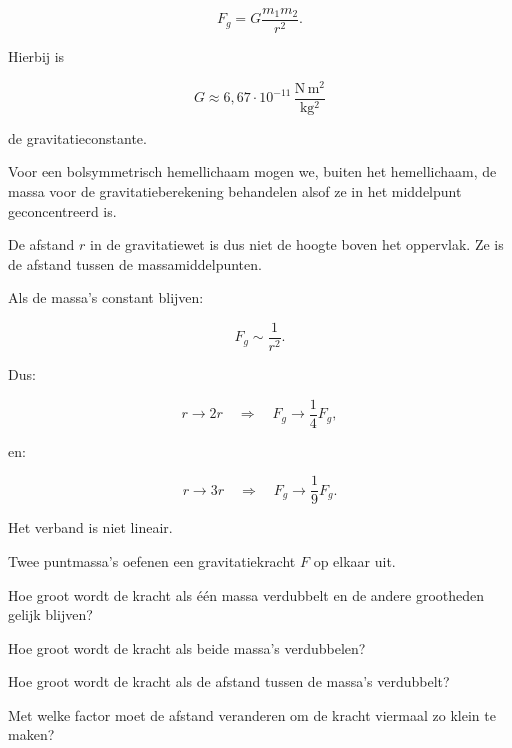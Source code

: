 \documentclass{ximera}
\begin{document}
\[
\boxed{
F_g=G\frac{m_1m_2}{r^2}.
}
\]

Hierbij is

\[
G\approx 6{,}67\cdot10^{-11}\,
\mathrm{\frac{N\,m^2}{kg^2}}
\]

de gravitatieconstante.

Voor een bolsymmetrisch hemellichaam mogen we, buiten het hemellichaam,
de massa voor de gravitatieberekening behandelen alsof ze in het
middelpunt geconcentreerd is.

\begin{opmerking}
De afstand $r$ in de gravitatiewet is dus niet de hoogte boven het
oppervlak. Ze is de afstand tussen de massamiddelpunten.
\end{opmerking}



Als de massa's constant blijven:

\[
F_g\sim\frac1{r^2}.
\]

Dus:

\[
r\rightarrow 2r
\quad\Longrightarrow\quad
F_g\rightarrow\frac14F_g,
\]

en:

\[
r\rightarrow 3r
\quad\Longrightarrow\quad
F_g\rightarrow\frac19F_g.
\]

Het verband is niet lineair.


\begin{oefening}{\oefB\ESS}

Twee puntmassa's oefenen een gravitatiekracht $F$ op elkaar uit.

\begin{question}
Hoe groot wordt de kracht als één massa verdubbelt en de andere
grootheden gelijk blijven?
\end{question}

\begin{question}
Hoe groot wordt de kracht als beide massa's verdubbelen?
\end{question}

\begin{question}
Hoe groot wordt de kracht als de afstand tussen de massa's verdubbelt?
\end{question}

\begin{question}
Met welke factor moet de afstand veranderen om de kracht viermaal zo
klein te maken?
\end{question}

\end{oefening}
\end{document}
